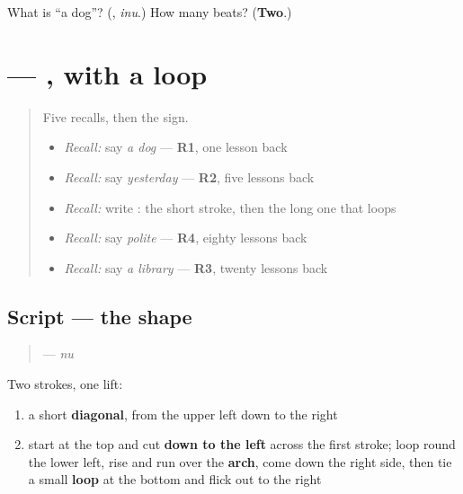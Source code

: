 \begin{tcolorbox}[breakable,colback=teal!4,colframe=teal!35!black,title={Before you move on}]
What is \textquotedblleft{}a dog\textquotedblright{}? (\textbf{}, \emph{inu}.) How many beats? (\textbf{Two}.)
\end{tcolorbox}
\section[\texorpdfstring{\ja{ぬ} (nu)}{ぬ (nu)}]{ — , with a loop}

\label{lesson:JA-W133-nu}



\begin{quote}
Five recalls, then the sign.

\begin{itemize}
\raggedright
  \item \emph{Recall:} say \emph{a dog} — \textbf{R1}, one lesson back
  \item \emph{Recall:} say \emph{yesterday} — \textbf{R2}, five lessons back
  \item \emph{Recall:} write \textbf{}: the short stroke, then the long one that loops
  \item \emph{Recall:} say \emph{polite} — \textbf{R4}, eighty lessons back
  \item \emph{Recall:} say \emph{a library} — \textbf{R3}, twenty lessons back
\end{itemize}
\end{quote}

\subsection*{Script — the shape}

\begin{quote}
\textbf{} — \emph{nu}
\end{quote}

Two strokes, one lift:

\begin{enumerate}
\raggedright
  \item a short \textbf{diagonal}, from the upper left down to the right
  \item start at the top and cut \textbf{down to the left} across the first stroke; loop round the lower left, rise and run over the \textbf{arch}, come down the right side, then tie a small \textbf{loop} at the bottom and flick out to the right
\end{enumerate}

